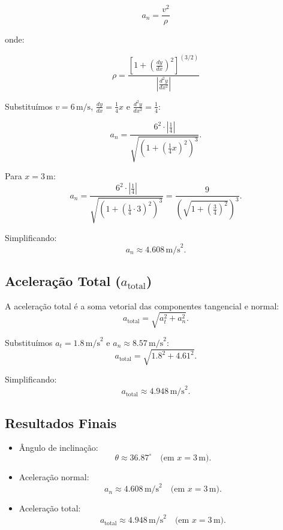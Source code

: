 \[
a_n = \frac{v^2}{\rho}
\]

onde:

\[
\rho = \frac{\left[1 + \left(\frac{dy}{dx}\right)^2 \right]^{(3/2)}}{ 
\left|\frac{d^2y}{dx^2} \right|}
\]


Substituímos \(v = 6 \, \text{m/s}\), \(\frac{dy}{dx} = \frac{1}{4}x\) e \(\frac{d^2y}{dx^2} = \frac{1}{4}\):

\[
a_n = \frac{6^2 \cdot \left|\frac{1}{4}\right|}{\sqrt{\left(1 + \left(\frac{1}{4}x\right)^2\right)^3}}.
\]

Para \(x = 3 \, \text{m}\):
\[
a_n = \frac{6^2 \cdot \left|\frac{1}{4}\right|}{\sqrt{\left(1 + \left(\frac{1}{4} \cdot 3\right)^2\right)^3}} = \frac{9}{\left(\sqrt{1 + \left(\frac{3}{4}\right)^2}\right)^3}.
\]

Simplificando:
\[
a_n \approx 4.608 \, \text{m/s}^2.
\]

\subsection*{Aceleração Total (\(a_{\text{total}}\))}
A aceleração total é a soma vetorial das componentes tangencial e normal:
\[
a_{\text{total}} = \sqrt{a_t^2 + a_n^2}.
\]

Substituímos \(a_t = 1.8 \, \text{m/s}^2\) e \(a_n \approx 8.57 \, \text{m/s}^2\):
\[
a_{\text{total}} = \sqrt{1.8^2 + 4.61^2}.
\]

Simplificando:
\[
a_{\text{total}} \approx 4.948 \, \text{m/s}^2.
\]

\subsection*{Resultados Finais}
\begin{itemize}
    \item Ângulo de inclinação:
    \[
    \theta \approx 36.87^\circ \quad \text{(em \(x = 3 \, \text{m}\))}.
    \]
    \item Aceleração normal:
    \[
    a_n \approx 4.608 \, \text{m/s}^2 \quad \text{(em \(x = 3 \, \text{m}\))}.
    \]
    \item Aceleração total:
    \[
    a_{\text{total}} \approx 4.948 \, \text{m/s}^2 \quad \text{(em \(x = 3 \, \text{m}\))}.
    \]
\end{itemize}
